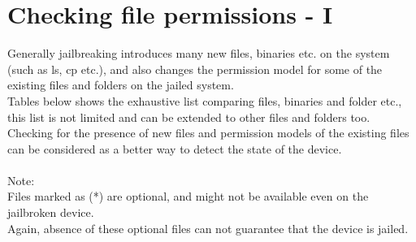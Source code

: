 \newpage
\section{Checking file permissions - I}
\vspace{20px}
Generally jailbreaking introduces many new files, binaries etc. on the system (such as ls, cp etc.), and also changes the permission model for some of the existing files and folders on the jailed system.\\
Tables below shows the exhaustive list comparing files, binaries and folder etc., this list is not limited and can be extended to other files and folders too.\\
Checking for the presence of new files and permission models of the existing files can be considered as a better way to detect the state of the device.\\\\
Note:\\
Files marked as (*) are optional, and might not be available even on the jailbroken device.\\
Again, absence of these optional files can not guarantee that the device is jailed.
